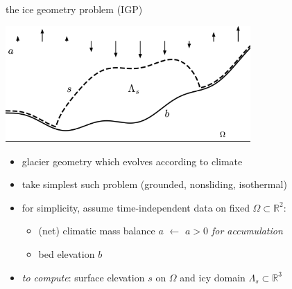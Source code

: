 \documentclass[usepdftitle=false,usenames,dvipsnames]{beamer}
\newcommand{\RR}{\mathbb{R}}
\begin{document}
\begin{frame}{the ice geometry problem (IGP)}

\vspace{-2mm}
\begin{center}
\includegraphics[width=0.7\textwidth]{figs/stokesdomain.png}
\end{center}

\vspace{-1mm}
\begin{itemize}
\item glacier geometry which evolves according to climate
\item take simplest such problem (grounded, nonsliding, isothermal)
\item for simplicity, assume time-independent data on fixed $\Omega \subset \RR^2$:
    \begin{itemize}
    \item (net) climatic mass balance $a$ \hfill $\gets$ \emph{$a>0$ for accumulation}
    \item bed elevation $b$
    \end{itemize}
\item \emph{to compute}: surface elevation $s$ on $\Omega$ and icy domain $\Lambda_s \subset \RR^3$
\end{itemize}
\end{frame}
\end{document}
